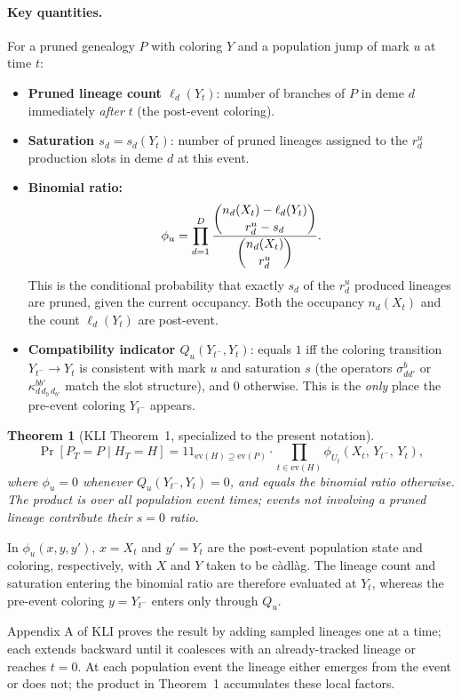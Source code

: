 \documentclass[11pt]{article}
\newcommand{\ind}{1\!\!1}
\theoremstyle{plain}
\newtheorem{theorem}{Theorem}
\begin{document}
\paragraph{Key quantities.} For a pruned genealogy $P$ with coloring $Y$ and a population jump of
mark $u$ at time $t$:
\begin{itemize}[leftmargin=1.6em]
\item \textbf{Pruned lineage count $\ell_d(Y_t)$}: number of branches of $P$ in deme $d$
immediately \emph{after} $t$ (the post-event coloring).
\item \textbf{Saturation $s_d=s_d(Y_t)$}: number of pruned lineages assigned to the $r^u_d$
production slots in deme $d$ at this event.
\item \textbf{Binomial ratio:}
\[
\phi_u=\prod_{d=1}^{D}
\frac{\dbinom{n_d(X_t)-\ell_d(Y_t)}{r^u_d-s_d}}{\dbinom{n_d(X_t)}{r^u_d}}.
\]
This is the conditional probability that exactly $s_d$ of the $r^u_d$ produced lineages are pruned,
given the current occupancy. Both the occupancy $n_d(X_t)$ and the count $\ell_d(Y_t)$ are
post-event.
\item \textbf{Compatibility indicator $Q_u(Y_{t^-},Y_t)$}: equals $1$ iff the coloring transition
$Y_{t^-}\to Y_t$ is consistent with mark $u$ and saturation $s$ (the operators $\sigma^b_{dd'}$ or
$\kappa^{bb'}_{d\,d_b\,d_{b'}}$ match the slot structure), and $0$ otherwise. This is the
\emph{only} place the pre-event coloring $Y_{t^-}$ appears.
\end{itemize}

\begin{theorem}[KLI Theorem~1, specialized to the present notation]
\[
\Pr\!\left[P_T=P\mid H_T=H\right]
=\ind_{\mathrm{ev}(H)\supseteq\mathrm{ev}(P)}\cdot
\prod_{t\in\mathrm{ev}(H)}\phi_{U_t}\!\left(X_t,\,Y_{t^-},\,Y_t\right),
\]
where $\phi_u=0$ whenever $Q_u(Y_{t^-},Y_t)=0$, and equals the binomial ratio otherwise. The
product is over all population event times; events not involving a pruned lineage contribute their
$s=0$ ratio.
\end{theorem}

In $\phi_u(x,y,y')$, $x=X_t$ and $y'=Y_t$ are the post-event population state and coloring,
respectively, with $X$ and $Y$ taken to be c\`adl\`ag. The lineage count and saturation entering
the binomial ratio are therefore evaluated at $Y_t$, whereas the pre-event coloring $y=Y_{t^-}$
enters only through $Q_u$.

Appendix A of KLI proves the result by adding sampled lineages one at a time;
each extends backward until it coalesces with an already-tracked lineage or reaches $t=0$.
At each population event the lineage either emerges from the event or does not;
the product in Theorem~1 accumulates these local factors.
\end{document}
